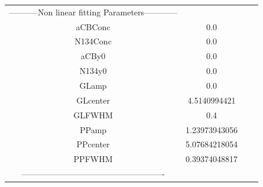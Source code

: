 \documentclass{article}
\begin{document}
\begin{tabular}{c c c c}

-----------Non linear fitting Parameters------------\\
aCBConc    &0.0\\
N134Conc   &0.0\\
aCBy0      &0.0\\
N134y0     &0.0\\
GLamp      &0.0\\
GLcenter   &4.5140994421\\
GLFWHM     &0.4\\
PPamp      &1.23973943056\\
PPcenter   &5.07684218054\\
PPFWHM     &0.39374048817\\
----------------------------------------------------\\


\end{tabular}
\end{document}
